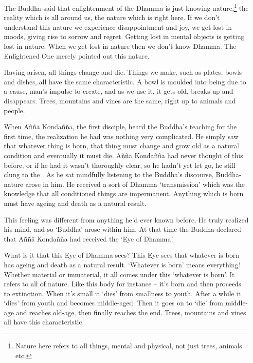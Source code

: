 The Buddha said that enlightenment of the Dhamma is just knowing nature,\footnote{Nature here refers to all things, mental and physical, not just trees, animals etc.} the reality which is all around us, the nature which is right here. If we don't understand this nature we experience disappointment and joy, we get lost in moods, giving rise to sorrow and regret. Getting lost in mental objects is getting lost in nature. When we get lost in nature then we don't know Dhamma. The Enlightened One merely pointed out this nature.

Having arisen, all things change and die. Things we make, such as plates, bowls and dishes, all have the same characteristic. A bowl is moulded into being due to a cause, man's impulse to create, and as we use it, it gets old, breaks up and disappears. Trees, mountains and vines are the same, right up to animals and people.

When A\~n\~n\=a Konda\~n\~na, the first disciple, heard the Buddha's teaching for the first time, the realization he had was nothing very complicated. He simply saw that whatever thing is born, that thing must change and grow old as a natural condition and eventually it must die. A\~n\~n\=a Konda\~n\~na had never thought of this before, or if he had it wasn't thoroughly clear, so he hadn't yet let go, he still clung to the . As he sat mindfully listening to the Buddha's discourse, Buddha-nature arose in him. He received a sort of Dhamma `transmission' which was the knowledge that all conditioned things are impermanent. Anything which is born must have ageing and death as a natural result.

This feeling was different from anything he'd ever known before. He truly realized his mind, and so `Buddha' arose within him. At that time the Buddha declared that A\~n\~n\=a Konda\~n\~na had received the `Eye of Dhamma'.

What is it that this Eye of Dhamma sees? This Eye sees that whatever is born has ageing and death as a natural result. `Whatever is born' means everything! Whether material or immaterial, it all comes under this `whatever is born'. It refers to all of nature. Like this body for instance -- it's born and then proceeds to extinction. When it's small it `dies' from smallness to youth. After a while it `dies' from youth and becomes middle-aged. Then it goes on to `die' from middle-age and reaches old-age, then finally reaches the end. Trees, mountains and vines all have this characteristic.

